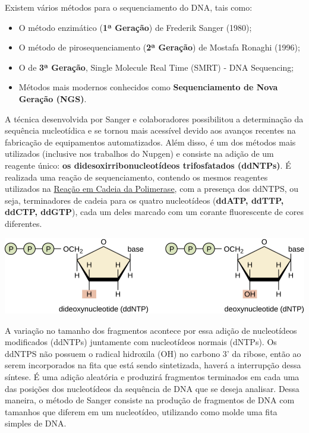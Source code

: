 \documentclass[
  letterpaper,
  DIV=11,
  numbers=noendperiod]{scrreprt}
\begin{document}
\begin{tcolorbox}[enhanced jigsaw, colbacktitle=quarto-callout-tip-color!10!white, toprule=.15mm, rightrule=.15mm, opacityback=0, left=2mm, arc=.35mm, breakable, colback=white, bottomtitle=1mm, opacitybacktitle=0.6, toptitle=1mm, leftrule=.75mm, coltitle=black, titlerule=0mm, bottomrule=.15mm, title=\textcolor{quarto-callout-tip-color}{\faLightbulb}\hspace{0.5em}{Aprendendo}]

Existem vários métodos para o sequenciamento do DNA, tais como:

\begin{itemize}
\item
  O método enzimático (\textbf{1ª Geração}) de Frederik Sanger (1980);
\item
  O método de pirosequenciamento (\textbf{2ª Geração}) de Mostafa
  Ronaghi (1996);
\item
  O de \textbf{3ª Geração}, Single Molecule Real Time (SMRT) - DNA
  Sequencing;
\item
  Métodos mais modernos conhecidos como \textbf{Sequenciamento de Nova
  Geração (NGS)}.
\end{itemize}

\end{tcolorbox}

A técnica desenvolvida por Sanger e colaboradores possibilitou a
determinação da sequência nucleotídica e se tornou mais acessível devido
aos avanços recentes na fabricação de equipamentos automatizados. Além
disso, é um dos métodos mais utilizados (inclusive nos trabalhos do
Nupgen) e consiste na adição de um reagente único: \textbf{os
didesoxirribonucleotídeos trifosfatados (ddNTPs)}. É realizada uma
reação de sequenciamento, contendo os mesmos reagentes utilizados na
\protect\hyperlink{amplificauxe7uxe3o}{Reação em Cadeia da Polimerase},
com a presença dos ddNTPS, ou seja, terminadores de cadeia para os
quatro nucleotídeos (\textbf{ddATP, ddTTP, ddCTP, ddGTP}), cada um deles
marcado com um corante fluorescente de cores diferentes.

\includegraphics{figures/ddNTPs.jpg}

A variação no tamanho dos fragmentos acontece por essa adição de
nucleotídeos modificados (ddNTPs) juntamente com nucleotídeos normais
(dNTPs). Os ddNTPS não possuem o radical hidroxila (OH) no carbono 3' da
ribose, então ao serem incorporados na fita que está sendo sintetizada,
haverá a interrupção dessa síntese. É uma adição aleatória e produzirá
fragmentos terminados em cada uma das posições dos nucleotídeos da
sequência de DNA que se deseja analisar. Dessa maneira, o método de
Sanger consiste na produção de fragmentos de DNA com tamanhos que
diferem em um nucleotídeo, utilizando como molde uma fita simples de
DNA.
\end{document}
